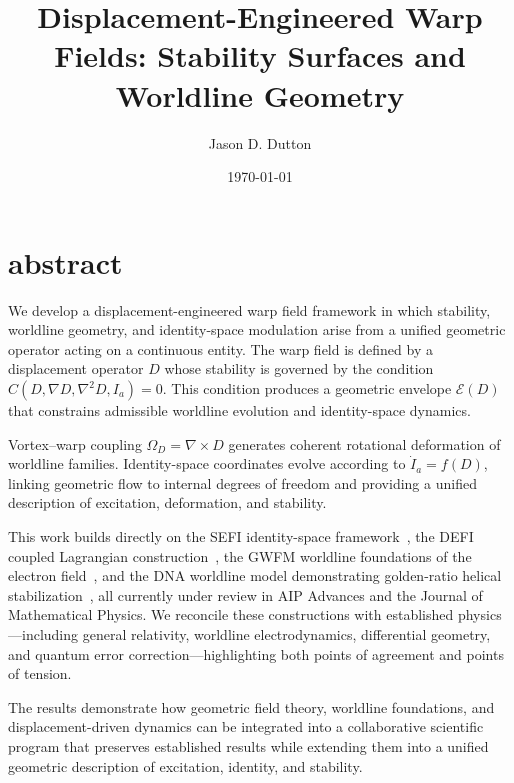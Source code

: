 \documentclass[aip,adv,reprint]{revtex4-2}
\begin{document}
\title{Displacement-Engineered Warp Fields: Stability Surfaces and Worldline Geometry}

\author{Jason D. Dutton}

\date{\today}

\maketitle

\section{abstract}
We develop a displacement-engineered warp field framework in which stability,
worldline geometry, and identity-space modulation arise from a unified geometric
operator acting on a continuous entity. The warp field is defined by a
displacement operator $D$ whose stability is governed by the condition
$C(D,\nabla D,\nabla^2 D,I_a)=0$. This condition produces a geometric envelope
$\mathcal{E}(D)$ that constrains admissible worldline evolution and identity-space
dynamics.

Vortex--warp coupling $\Omega_D=\nabla\times D$ generates coherent rotational
deformation of worldline families. Identity-space coordinates evolve according
to $\dot{I}_a=f(D)$, linking geometric flow to internal degrees of freedom and
providing a unified description of excitation, deformation, and stability.

This work builds directly on the SEFI identity-space framework~\cite{Dutton_SEFI_JMP_2026},
the DEFI coupled Lagrangian construction~\cite{Dutton_DEFI_2026},
the GWFM worldline foundations of the electron field~\cite{Dutton_GWFM_JMP_2026},
and the DNA worldline model demonstrating golden-ratio helical stabilization~\cite{Dutton_DNA_2026},
all currently under review in AIP Advances and the Journal of Mathematical Physics.
We reconcile these constructions with established physics—including general
relativity, worldline electrodynamics, differential geometry, and quantum error
correction—highlighting both points of agreement and points of tension.

The results demonstrate how geometric field theory, worldline foundations, and
displacement-driven dynamics can be integrated into a collaborative scientific
program that preserves established results while extending them into a unified
geometric description of excitation, identity, and stability.
\end{document}
